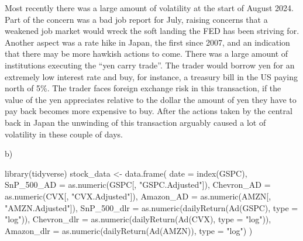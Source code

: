 \documentclass[
  letterpaper,
  DIV=11,
  numbers=noendperiod]{scrartcl}
\newenvironment{Shaded}{\begin{snugshade}}{\end{snugshade}}
\newcommand{\AttributeTok}[1]{\textcolor[rgb]{0.40,0.45,0.13}{#1}}
\newcommand{\FunctionTok}[1]{\textcolor[rgb]{0.28,0.35,0.67}{#1}}
\newcommand{\NormalTok}[1]{\textcolor[rgb]{0.00,0.23,0.31}{#1}}
\newcommand{\OtherTok}[1]{\textcolor[rgb]{0.00,0.23,0.31}{#1}}
\newcommand{\StringTok}[1]{\textcolor[rgb]{0.13,0.47,0.30}{#1}}
\begin{document}
Most recently there was a large amount of volatility at the start of
August 2024. Part of the concern was a bad job report for July, raising
concerns that a weakened job market would wreck the soft landing the FED
has been striving for. Another aspect was a rate hike in Japan, the
first since 2007, and an indication that there may be more hawkish
actions to come. There was a large amount of institutions executing the
``yen carry trade''. The trader would borrow yen for an extremely low
interest rate and buy, for instance, a treasury bill in the US paying
north of 5\%. The trader faces foreign exchange risk in this
transaction, if the value of the yen appreciates relative to the dollar
the amount of yen they have to pay back becomes more expensive to buy.
After the actions taken by the central back in Japan the unwinding of
this transaction arguably caused a lot of volatility in these couple of
days.

b)

\begin{Shaded}
\begin{Highlighting}[]
\FunctionTok{library}\NormalTok{(tidyverse)}
\NormalTok{stock\_data }\OtherTok{\textless{}{-}} \FunctionTok{data.frame}\NormalTok{(}
  \AttributeTok{date =} \FunctionTok{index}\NormalTok{(GSPC),}
  \AttributeTok{SnP\_500\_AD =} \FunctionTok{as.numeric}\NormalTok{(GSPC[, }\StringTok{"GSPC.Adjusted"}\NormalTok{]),}
  \AttributeTok{Chevron\_AD =} \FunctionTok{as.numeric}\NormalTok{(CVX[, }\StringTok{"CVX.Adjusted"}\NormalTok{]),}
  \AttributeTok{Amazon\_AD =} \FunctionTok{as.numeric}\NormalTok{(AMZN[, }\StringTok{"AMZN.Adjusted"}\NormalTok{]),}
  \AttributeTok{SnP\_500\_dlr =} \FunctionTok{as.numeric}\NormalTok{(}\FunctionTok{dailyReturn}\NormalTok{(}\FunctionTok{Ad}\NormalTok{(GSPC), }\AttributeTok{type =} \StringTok{"log"}\NormalTok{)),}
  \AttributeTok{Chevron\_dlr =} \FunctionTok{as.numeric}\NormalTok{(}\FunctionTok{dailyReturn}\NormalTok{(}\FunctionTok{Ad}\NormalTok{(CVX), }\AttributeTok{type =} \StringTok{"log"}\NormalTok{)),}
  \AttributeTok{Amazon\_dlr =} \FunctionTok{as.numeric}\NormalTok{(}\FunctionTok{dailyReturn}\NormalTok{(}\FunctionTok{Ad}\NormalTok{(AMZN)), }\AttributeTok{type =} \StringTok{"log"}\NormalTok{)}
\NormalTok{)}
\end{Highlighting}
\end{Shaded}
\end{document}
